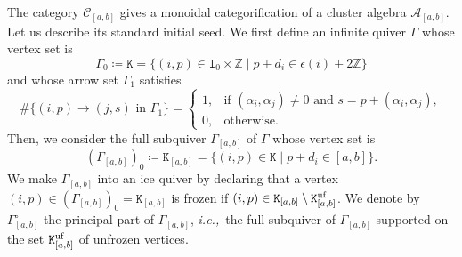 \documentclass[12pt]{amsart}
\theoremstyle{definition}
\theoremstyle{remark}
\numberwithin{equation}{section}
\newcommand{\ie}{\textit{i.e.,}\ }
\begin{document}
The category $\mathcal{C}_{[a,b]}$ gives a monoidal categorification of a cluster algebra $\mathcal{A}_{[a,b]}$. 
Let us describe its standard initial seed.
We first define an infinite quiver $\Gamma$ whose vertex set is 
\begin{equation}\label{eq:Gamma0}
\Gamma_0 \coloneqq \mathtt{K}=\{(i,p)\in \mathtt I_0\times \mathbb Z\mid p+d_i\in \epsilon(i)+2\mathbb{Z}\}
\end{equation}
and whose arrow set $\Gamma_1$ satisfies
\begin{equation}\label{eq:Gamma1} 
\# \{ \text{$(i,p) \to (j,s)$ in $\Gamma_1$}\} = \begin{cases} 
1, & \text{if $(\alpha_i,\alpha_j) \neq 0$ and $s = p + (\alpha_i,\alpha_j)$},\\
0, & \text{otherwise.}
\end{cases}
\end{equation}
Then, we consider the full subquiver $\Gamma_{[a,b]}$ of $\Gamma$ whose vertex set is 
\[ (\Gamma_{[a,b]})_0 \coloneqq \mathtt{K}_{[a,b]}=\{(i,p)\in \mathtt{K}    \mid p+d_i\in [a,b]\}.\]
We make $\Gamma_{[a,b]}$ into an ice quiver by declaring that a vertex $(i,p)\in (\Gamma_{[a,b]})_0=\mathtt{K}_{[a,b]}$ is frozen if $(i,p)\in \mathtt{K}_{[a,b]}\setminus \mathtt{K}_{[a,b]}^{\rm uf}$. 
We denote by $\Gamma_{[a,b]}^\circ$ the principal part of $\Gamma_{[a,b]}$, \ie the full subquiver of $\Gamma_{[a,b]}$ supported on the set $\mathtt{K}_{[a,b]}^{\rm uf}$ of unfrozen vertices.
\end{document}
